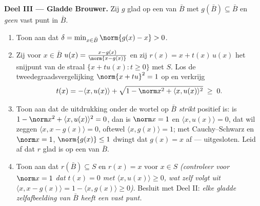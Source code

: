\begin{problem}
\medskip
\noindent\textbf{Deel III --- Gladde Brouwer.} Zij $g$ glad op
een  van $\bar B$ met $g(\bar B) \subseteq \bar B$ en
\emph{geen} vast punt in $\bar B$.
\begin{enumerate}[resume]
  \item Toon aan dat $\delta = \min_{x\in\bar B}\norm{g(x) - x} >
        0$.
  \item Zij voor $x \in \bar B$ $u(x) = \frac{x -
        g(x)}{\norm{x - g(x)}}$ en zij $r(x) = x + t(x)\,u(x)$
        het snijpunt van de straal $\{x + tu(x) : t \geq 0\}$ met
        $S$. Los de tweedegraadsvergelijking $\norm{x + tu}^2 =
        1$ op en verkrijg
        \[
        t(x) = -\langle x, u(x)\rangle +
        \sqrt{1 - \norm x^2 + \langle x, u(x)\rangle^2}
        \;\geq\; 0 .
        \]
  \item Toon aan dat de uitdrukking onder de wortel op $\bar B$
        \emph{strikt} positief is: is $1 - \norm x^2 + \langle x,
        u(x)\rangle^2 = 0$, dan is $\norm x = 1$ en $\langle x,
        u(x)\rangle = 0$, dat wil zeggen $\langle x, x -
        g(x)\rangle = 0$, oftewel $\langle x, g(x)\rangle = 1$;
        met Cauchy--Schwarz en $\norm x = 1$, $\norm{g(x)} \leq
        1$ dwingt dat $g(x) = x$ af --- uitgesloten. Leid af dat
        $r$ glad is op een  van $\bar B$.
  \item Toon aan dat $r(\bar B) \subseteq S$ en $r(x) = x$ voor
        $x \in S$ \emph{(controleer voor $\norm x = 1$ dat $t(x)
        = 0$ met $\langle x, u(x)\rangle \geq 0$, wat zelf volgt
        uit $\langle x, x - g(x)\rangle = 1 - \langle x,
        g(x)\rangle \geq 0$)}. Besluit met Deel II: \emph{elke
        gladde zelfafbeelding van $\bar B$ heeft een vast
        punt.}
\end{enumerate}


\end{problem}
